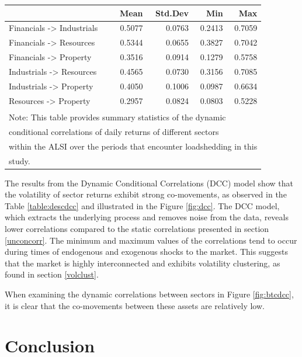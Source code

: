 \documentclass[11pt,preprint, authoryear]{elsarticle}
\let\origtable\table
\let\endorigtable\endtable
\renewenvironment{table}[1][2] {
    \expandafter\origtable\expandafter[H]
} {
    \endorigtable
}
\numberwithin{equation}{section}
\numberwithin{figure}{section}
\numberwithin{table}{section}
\begin{document}
\begin{table}
\centering\begingroup\fontsize{9}{11}\selectfont

\begin{tabular}{l|r|r|r|r}
\hline
  & Mean & Std.Dev & Min & Max\\
\hline
Financials -> Industrials & 0.5077 & 0.0763 & 0.2413 & 0.7059\\
\hline
Financials -> Resources & 0.5344 & 0.0655 & 0.3827 & 0.7042\\
\hline
Financials -> Property & 0.3516 & 0.0914 & 0.1279 & 0.5758\\
\hline
Industrials -> Resources & 0.4565 & 0.0730 & 0.3156 & 0.7085\\
\hline
Industrials -> Property & 0.4050 & 0.1006 & 0.0987 & 0.6634\\
\hline
Resources -> Property & 0.2957 & 0.0824 & 0.0803 & 0.5228\\
\hline
\multicolumn{5}{l}{\textsuperscript{} Note: This table provides summary statistics of the dynamic}\\
\multicolumn{5}{l}{conditional correlations of daily returns of different sectors}\\
\multicolumn{5}{l}{within the ALSI over the periods that encounter loadshedding in this}\\
\multicolumn{5}{l}{study.}\\
\end{tabular}
\endgroup{}
\end{table}

The results from the Dynamic Conditional Correlations (DCC) model show
that the volatility of sector returns exhibit strong co-movements, as
observed in the Table \ref{table:descdcc} and illustrated in the Figure
\ref{fig:dcc}. The DCC model, which extracts the underlying process and
removes noise from the data, reveals lower correlations compared to the
static correlations presented in section \ref{unconcorr}. The minimum
and maximum values of the correlations tend to occur during times of
endogenous and exogenous shocks to the market. This suggests that the
market is highly interconnected and exhibits volatility clustering, as
found in section \ref{volclust}.

When examining the dynamic correlations between sectors in Figure
\ref{fig:btcdcc}, it is clear that the co-movements between these assets
are relatively low.

\hfill

\hypertarget{conclusion}{%
\section{Conclusion}\label{conclusion}}
\end{document}
